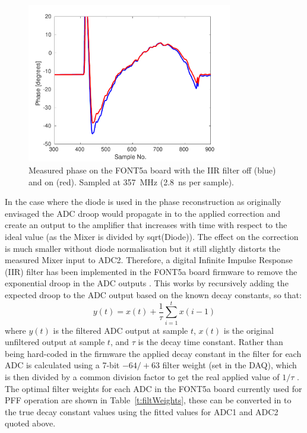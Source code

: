 \begin{figure}
  \centering
  \includegraphics[width=0.8\textwidth]{Figures/commissioning/iirPhaseFiltOffOn}
  \caption{Measured phase on the FONT5a board with the IIR filter off (blue) and on (red). Sampled at 357~MHz (2.8~ns per sample).}
  \label{f:iirPhasefiltOffOn}
\end{figure}


In the case where the diode is used in the phase reconstruction as originally envisaged the ADC droop would propagate in to the applied correction and create an output to the amplifier that increases with time with respect to the ideal value (as the Mixer is divided by sqrt(Diode)). The effect on the correction is much smaller without diode normalisation but it still slightly distorts the measured Mixer input to ADC2. Therefore, a digital Infinite Impulse Response (IIR) filter has been implemented in the FONT5a board firmware to remove the exponential droop in the ADC outputs \cite{glennCLIC14}. This works by recursively adding the expected droop to the ADC output based on the known decay constants, so that:
\begin{equation}
y(t) = x(t) + \frac{1}{\tau} \sum_{i=1}^{t} x(i-1)
\end{equation}
\label{e:iirFilt}
\hspace{-0.3cm} where \(y(t)\) is the filtered ADC output at sample \(t\), \(x(t)\) is the original unfiltered output at sample \(t\), and \(\tau\) is the decay time constant. Rather than being hard-coded in the firmware the applied decay constant in the filter for each ADC is calculated using a 7-bit \(-64/+63\) filter weight (set in the DAQ), which is then divided by a common division factor to get the real applied value of \(1/\tau\) \cite{glennPriv}. The optimal filter weights for each ADC in the FONT5a board currently used for PFF operation are shown in Table~\ref{t:filtWeights}, these can be converted in to the true decay constant values using the fitted values for ADC1 and ADC2 quoted above.

